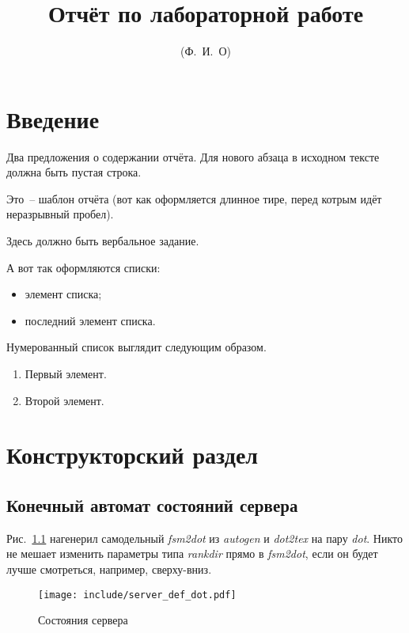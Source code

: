 \documentclass[a4paper,12pt]{report}
\title{Отчёт по лабораторной работе \textnumero 1}
\author{(Ф.~И.~О)}
\begin{document}
\maketitle

\tableofcontents

\chapter*{Введение}

Два предложения о содержании отчёта. Для нового абзаца в исходном тексте должна быть пустая строка.

Это~-- шаблон отчёта (вот как оформляется длинное тире, перед котрым идёт неразрывный пробел).


Здесь должно быть вербальное задание.

А вот так оформляются списки:
\begin{itemize}
\item элемент списка;
\item последний элемент списка.
\end{itemize}

Нумерованный список выглядит следующим образом.
\begin{enumerate}
\item Первый элемент.
\item Второй элемент.
\end{enumerate}


\chapter{Конструкторский раздел}

\section{Конечный автомат состояний сервера}

Рис.~\ref{fig:fsm} нагенерил самодельный \textit{fsm2dot} из \textit{autogen} и \textit{dot2tex} на пару \textit{dot}. Никто не мешает изменить параметры типа \textit{rankdir} прямо в \textit{fsm2dot}, если он будет лучше смотреться, например, сверху-вниз.

\begin{figure}
\centering
\texttt{[image: include/server\_def\_dot.pdf]}
\caption{Состояния сервера}
\label{fig:fsm}
\end{figure}
\end{document}
